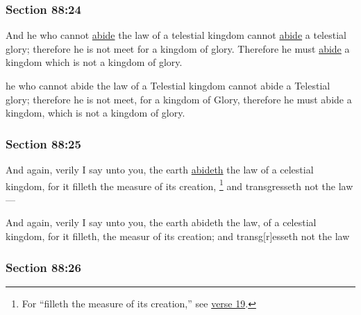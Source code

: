 	\subsubsection{Section 88:24} %
		\label{DC88-24}

		And he who cannot \hyperref[ABIDE]{abide} the law of a telestial kingdom cannot \hyperref[ABIDE]{abide} a telestial glory; therefore he is not meet for a kingdom of glory. Therefore he must \hyperref[ABIDE]{abide} a kingdom which is not a kingdom of glory.

		\begin{framed}
		\scriptsize
			\begin{compactdesc}
				\item[JSP] he who cannot abide the law of a Telestial kingdom cannot abide a Telestial glory; therefore he is not meet, for a kingdom of Glory, therefore he must abide a kingdom, which is not a kingdom of glory.
			\end{compactdesc}
		\end{framed}

	\subsubsection{Section 88:25} %
		\label{DC88-25}

		And again, verily I say unto you, the earth \hyperref[ABIDE]{abideth} the law of a celestial kingdom, for it filleth the measure of its creation,%
			\footnote{%
				For ``filleth the measure of its creation,'' see \hyperref[DC88-19]{verse 19}.
				} 
		and transgresseth not the law---

		\begin{framed}
		\scriptsize
			\begin{compactdesc}
				\item[JSP] And again, verily I say unto you, the earth abideth the law, of a celestial kingdom, for it filleth, the measur of its creation; and transg[r]esseth not the law
			\end{compactdesc}
		\end{framed}

	\subsubsection{Section 88:26} %
		\label{DC88-26}

